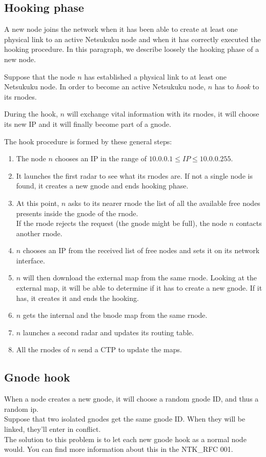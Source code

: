 \documentclass[a4paper]{article}
\begin{document}
\subsection{Hooking phase}
A new node joins the network when it has been able to create at least one
physical link to an active Netsukuku node and when it has correctly executed
the hooking procedure. In this paragraph, we describe loosely the hooking
phase of a new node.

Suppose that the node $n$ has established a physical link to at least one Netsukuku
node. In order to become an active Netsukuku node, $n$ has to \emph{hook} to
its rnodes.

During the hook, $n$ will exchange vital information with its rnodes,
it will choose its new IP and it will finally become part of a gnode.

The hook procedure is formed by these general steps:
\begin{enumerate}
	\item The node $n$ chooses an IP in the range of $10.0.0.1 \le IP \le
		10.0.0.255$.
	\item It launches the first radar to see what its rnodes are. If not a
		single node is found, it creates a new gnode and ends hooking
		phase.
	\item At this point, $n$ asks to its nearer rnode the list of all the
		available free nodes presents inside the gnode of the rnode.\\
		If the rnode rejects the request (the gnode might be full),
		the node $n$ contacts another rnode.
	\item $n$ chooses an IP from the received list of free nodes and sets
		it on its network interface.
	\item $n$ will then download the external map from the same rnode.
		Looking at the external map, it will be able to determine if
		it has to create a new gnode. If it has, it creates it and
		ends the hooking.
	\item $n$ gets the internal and the bnode map from the same rnode.
	\item $n$ launches a second radar and updates its routing table.
	\item All the rnodes of $n$ send a CTP to update the maps.
\end{enumerate}


\subsection{Gnode hook}
When a node creates a new gnode, it will choose a random gnode ID, and thus
a random ip.\\
Suppose that two isolated gnodes get the same gnode ID. When they will be
linked, they'll enter in conflict.\\
The solution to this problem is to let each new gnode hook as a normal node
would. You can find more information about this in the NTK\_RFC 001\cite{gnodecontiguity}.
\end{document}
